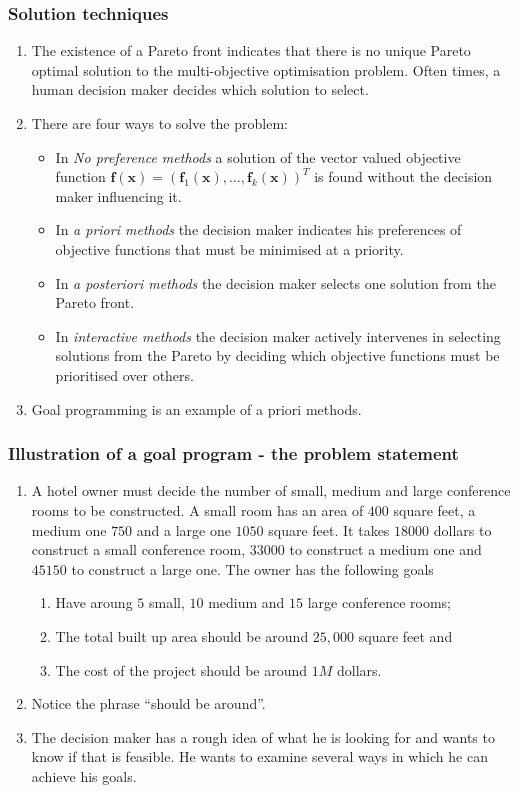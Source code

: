 \documentclass{beamer}
\begin{document}
\begin{frame}
\frametitle{Solution techniques}
\begin{enumerate}
\item The existence of a Pareto front indicates that there is no unique Pareto
optimal solution to the multi-objective optimisation problem. Often times, a 
human decision maker decides which solution to select.
\item There are four ways to solve the problem:
\begin{itemize}
\item In \emph{No preference methods} a solution of the vector valued objective
function $\bm{f}(\bm{x}) = (\bm{f}_1(\bm{x}), \ldots, \bm{f}_k(\bm{x}))^T$ is
found without the decision maker influencing it.
\item In \emph{a priori methods} the decision maker indicates his preferences of
objective functions that must be minimised at a priority.
\item In \emph{a posteriori methods} the decision maker selects one solution 
from the Pareto front.
\item In \emph{interactive methods} the decision maker actively intervenes in
selecting solutions from the Pareto by deciding which objective functions must
be prioritised over others.
\end{itemize}
\item Goal programming is an example of a priori methods.
\end{enumerate}
\end{frame}

\begin{frame}
\frametitle{Illustration of a goal program - the problem statement}
\begin{enumerate}
\item A hotel owner must decide the number of small, medium and large conference
rooms to be constructed. A small room has an area of $400$ square feet, a medium
one $750$ and a large one $1050$ square feet. It takes $18000$ dollars to 
construct a small conference room, $33000$ to construct a medium one and $45150$ 
to construct a large one. The owner has the following goals
\begin{enumerate}
\item Have aroung $5$ small, $10$ medium and $15$ large conference rooms;
\item The total built up area should be around $25,000$ square feet and
\item The cost of the project should be around $1 M$ dollars. 
\end{enumerate}
\item Notice the phrase ``should be around''.
\item The decision maker has a rough idea of what he is looking for and wants to 
know if that is feasible. He wants to examine several ways in which he can 
achieve his goals.
\end{enumerate}
\end{frame}
\end{document}

